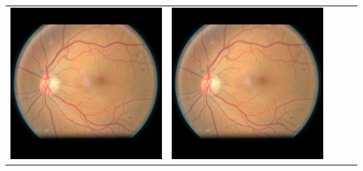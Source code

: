 \documentclass{beamer}
\begin{document}
\begin{frame}
\begin{tabular}{|C{0.2\textwidth}|C{0.2\textwidth}|C{0.2\textwidth}|C{0.2\textwidth}|C{0.2\textwidth}|}
	\includegraphics[width=\linewidth]{pics/328_right_3.jpg} &
	\includegraphics[width=\linewidth]{pics/328_right_3.jpg} &

\end{tabular}
\end{frame}
\end{document}

